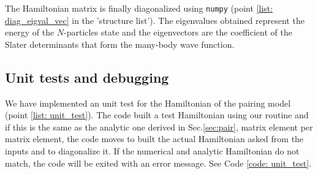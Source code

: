 \documentclass[twoside]{article}
\begin{document}
The Hamiltonian matrix is finally diagonalized using \texttt{numpy} (point \ref{list: diag_eigval_vec} in the 'structure list'). The eigenvalues obtained represent the energy of the $N$-particles state and the eigenvectors are the coefficient of the Slater determinants that form the many-body wave function. %


\subsection{Unit tests and debugging}
\label{subsec:unit}

We have implemented an unit test for the Hamiltonian of the pairing model (point \ref{list: unit_test}). The code built a test Hamiltonian using our routine and if this is the same as the analytic one derived in Sec.\ref{sec:pair}, matrix element per matrix element, the code moves to built the actual Hamiltonian asked from the inputs and to diagonalize it. %
If the numerical and analytic Hamiltonian do not match, the code will be exited with an error message. See Code \ref{code: unit_test}.
\end{document}
